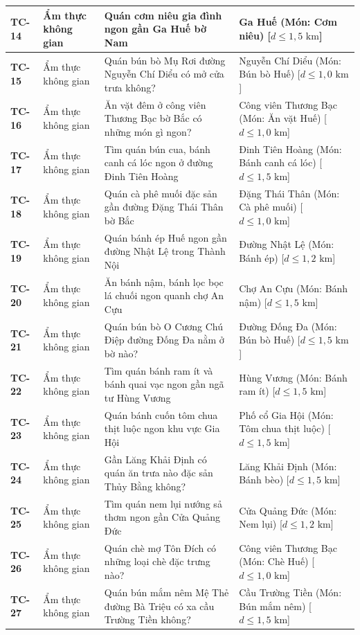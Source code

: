 \begin{longtable}{|>{\centering\arraybackslash\bfseries}p{1.35cm}|>{\raggedright\arraybackslash}p{2.6cm}|>{\raggedright\arraybackslash}p{6.35cm}|>{\raggedright\arraybackslash}p{4.3cm}|}
TC-14 & Ẩm thực không gian & Quán cơm niêu gia đình ngon gần Ga Huế bờ Nam & Ga Huế (Món: Cơm niêu) [$d \le 1{,}5\text{ km}$] \\ \hline
TC-15 & Ẩm thực không gian & Quán bún bò Mụ Rơi đường Nguyễn Chí Diểu có mở cửa trưa không? & Nguyễn Chí Diểu (Món: Bún bò Huế) [$d \le 1{,}0\text{ km}$] \\ \hline
TC-16 & Ẩm thực không gian & Ăn vặt đêm ở công viên Thương Bạc bờ Bắc có những món gì ngon? & Công viên Thương Bạc (Món: Ăn vặt Huế) [$d \le 1{,}0\text{ km}$] \\ \hline
TC-17 & Ẩm thực không gian & Tìm quán bún cua, bánh canh cá lóc ngon ở đường Đinh Tiên Hoàng & Đinh Tiên Hoàng (Món: Bánh canh cá lóc) [$d \le 1{,}5\text{ km}$] \\ \hline
TC-18 & Ẩm thực không gian & Quán cà phê muối đặc sản gần đường Đặng Thái Thân bờ Bắc & Đặng Thái Thân (Món: Cà phê muối) [$d \le 1{,}0\text{ km}$] \\ \hline
TC-19 & Ẩm thực không gian & Quán bánh ép Huế ngon gần đường Nhật Lệ trong Thành Nội & Đường Nhật Lệ (Món: Bánh ép) [$d \le 1{,}2\text{ km}$] \\ \hline
TC-20 & Ẩm thực không gian & Ăn bánh nậm, bánh lọc bọc lá chuối ngon quanh chợ An Cựu & Chợ An Cựu (Món: Bánh nậm) [$d \le 1{,}5\text{ km}$] \\ \hline
TC-21 & Ẩm thực không gian & Quán bún bò O Cương Chú Điệp đường Đống Đa nằm ở bờ nào? & Đường Đống Đa (Món: Bún bò Huế) [$d \le 1{,}5\text{ km}$] \\ \hline
TC-22 & Ẩm thực không gian & Tìm quán bánh ram ít và bánh quai vạc ngon gần ngã tư Hùng Vương & Hùng Vương (Món: Bánh ram ít) [$d \le 1{,}5\text{ km}$] \\ \hline
TC-23 & Ẩm thực không gian & Quán bánh cuốn tôm chua thịt luộc ngon khu vực Gia Hội & Phố cổ Gia Hội (Món: Tôm chua thịt luộc) [$d \le 1{,}5\text{ km}$] \\ \hline
TC-24 & Ẩm thực không gian & Gần Lăng Khải Định có quán ăn trưa nào đặc sản Thủy Bằng không? & Lăng Khải Định (Món: Bánh bèo) [$d \le 1{,}5\text{ km}$] \\ \hline
TC-25 & Ẩm thực không gian & Tìm quán nem lụi nướng sả thơm ngon gần Cửa Quảng Đức & Cửa Quảng Đức (Món: Nem lụi) [$d \le 1{,}2\text{ km}$] \\ \hline
TC-26 & Ẩm thực không gian & Quán chè mợ Tôn Đích có những loại chè đặc trưng nào? & Công viên Thương Bạc (Món: Chè Huế) [$d \le 1{,}0\text{ km}$] \\ \hline
TC-27 & Ẩm thực không gian & Quán bún mắm nêm Mệ Thẻ đường Bà Triệu có xa cầu Trường Tiền không? & Cầu Trường Tiền (Món: Bún mắm nêm) [$d \le 1{,}5\text{ km}$] \\ \hline

\end{longtable}
